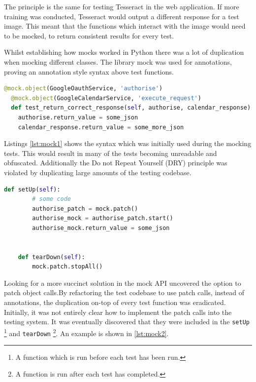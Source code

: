 The principle is the same for testing Tesseract in the web application. If more training was conducted, Tesseract would output a different response for a test image. This meant that the functions which interact with the image would need to be mocked, to return consistent results for every test.

Whilst establishing how mocks worked in Python there was a lot of duplication when mocking different classes. The library mock \cite{citeulike:14020599} was used for annotations, proving an annotation style syntax above test functions.

\begin{lstlisting}[language=python, caption={An example of using mocks, following the annotation pattern}, label={lst:mock1}, breaklines, columns=fullflexible, keywordstyle=\color{blue}, basicstyle=\normalsize\ttfamily]
  @mock.object(GoogleOauthService, 'authorise')
  @mock.object(GoogleCalendarService, 'execute_request')
  def test_return_correct_response(self, authorise, calendar_response):
    authorise.return_value = some_json
    calendar_response.return_value = some_more_json
\end{lstlisting}

Listings \ref{lst:mock1} shows the syntax which was initially used during the mocking tests. This would result in many of the tests becoming unreadable and obfuscated. Additionally the Do not Repeat Yourself (DRY) principle was violated by duplicating large amounts of the testing codebase.

\begin{lstlisting}[language=python, label={lst:mock2}, breaklines, columns=fullflexible, keywordstyle=\color{blue}, caption={Mocks using the patch and start. It stops in the dear downs}, basicstyle=\normalsize\ttfamily]
    def setUp(self):
        # some code
        authorise_patch = mock.patch()
        authorise_mock = authorise_patch.start()
        authorise_mock.return_value = some_json


    def tearDown(self):
        mock.patch.stopAll()
\end{lstlisting}

Looking for a more succinct solution in the mock API uncovered the option to patch object calls.By refactoring the test codebase to use patch calls, instead of annotations, the duplication on-top of every test function was eradicated. Initially, it was not entirely clear how to implement the patch calls into the testing system. It was eventually discovered that they were included in the \texttt{setUp} \footnote{A function which is run before each test has been run.} and \texttt{tearDown} \footnote{A function is run after each test has completed.}. An example is shown in \ref{lst:mock2}.

